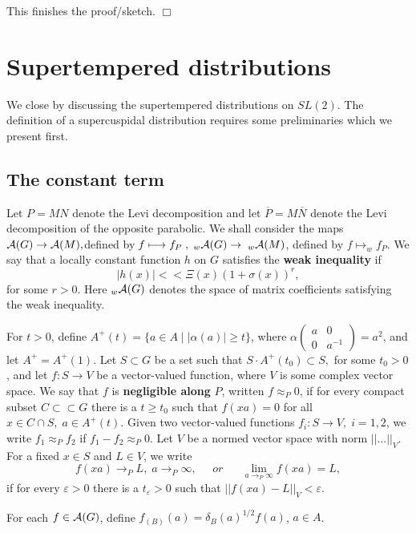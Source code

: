This finishes the proof/sketch. $\Box $

\section{Supertempered distributions}

We close by discussing the supertempered distributions on $SL(2)$. The
definition of a supercuspidal distribution requires some preliminaries which
we present first.

\subsection{The constant term}

Let $P=MN$ denote the Levi decomposition and let $\overline{P}=M\overline{N}$
denote the Levi decomposition of the opposite parabolic. We shall consider
the maps ${\cal A}(G)\rightarrow {\cal A}(M),$defined by$\;f\longmapsto
f_P\;,\;_w{\cal A}(G)\rightarrow \;_w{\cal A}(M)$, defined by $f\longmapsto
_wf_P$. We say that a locally constant function $h$ on $G$ satisfies the 
{\bf weak inequality} if 
\[
|h(x)|<<\Xi (x)(1+\sigma (x))^r, 
\]
for some $r>0.$ Here $_w{\cal A}(G)$ denotes the space of matrix
coefficients satisfying the weak inequality.

For $t>0$, define $A^{+}(t)=\{a\in A\;|\;|\alpha (a)|\geq t\}$, where $%
\alpha \left( 
\begin{array}{cc}
a & 0 \\ 
0 & a^{-1}
\end{array}
\right) =a^2$, and let $A^{+}=A^{+}(1)$. Let $S\subset G$ be a set such that 
$S\cdot A^{+}(t_0)\subset S,$ for some $t_0>0$, and let $f:S\rightarrow V$
be a vector-valued function, where $V$ is some complex vector space. We say
that $f$ is {\bf negligible along} $P$, written $f\approx _P0$, if for every
compact subset $C\subset \subset G$ there is a $t\geq t_0$ such that $%
f(xa)=0 $ for all $x\in C\cap S,\;a\in A^{+}(t)$. Given two vector-valued
functions $f_i:S\rightarrow V,\;i=1,2$, we write $f_1\approx _Pf_2$ if $%
f_1-f_2\approx _P0.$ Let $V$ be a normed vector space with norm $||...||_V$.
For a fixed $x\in S$ and $L\in V$, we write 
\[
f(xa)\rightarrow _PL,\;a\rightarrow _P\infty ,\;\;\;\;\;or\;\;\;\;\;\;\lim
_{a\rightarrow _P\infty }f(xa)=L, 
\]
if for every $\varepsilon >0$ there is a $t_\varepsilon >0$ such that $%
||f(xa)-L||_V<\varepsilon $.

For each $f\in {\cal A}(G)$, define $f_{(B)}(a)=\delta _B(a)^{1/2}f(a)$, $%
a\in A$.

